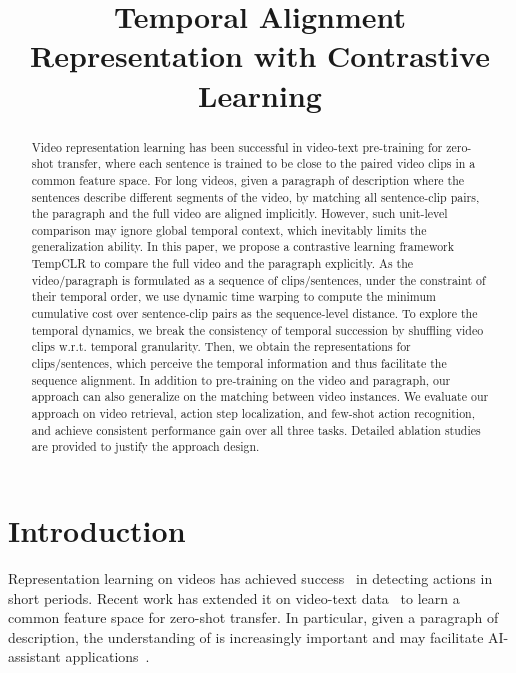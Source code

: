 \title{Temporal Alignment Representation with Contrastive Learning}



\maketitle
\let\thefootnote\relax{}

\begin{abstract}

Video representation learning has been successful in video-text pre-training for zero-shot transfer, where each sentence is trained to be close to the paired video clips in a common feature space. For long videos, given a paragraph of description where the sentences describe different segments of the video, by matching all sentence-clip pairs,  the paragraph and the full video are aligned implicitly. However, such unit-level comparison may ignore global temporal context, which inevitably limits the generalization ability. In this paper, we propose a contrastive learning framework TempCLR to compare the full video and the paragraph explicitly. As the video/paragraph is formulated as a sequence of clips/sentences, under the constraint of their temporal order, we use dynamic time warping to compute the minimum cumulative cost over sentence-clip pairs as the sequence-level distance. To explore the temporal dynamics, we break the consistency of temporal succession by shuffling video clips w.r.t. temporal granularity. Then, we obtain the representations for clips/sentences, which perceive the temporal information and thus facilitate the sequence alignment. In addition to pre-training on the video and paragraph, our approach can also generalize on the matching between video instances. We evaluate our approach on video retrieval, action step localization, and few-shot action recognition, and achieve consistent performance gain over all three tasks. Detailed ablation studies are provided to justify the approach design.

\end{abstract}

\section{Introduction}

Representation learning on videos has achieved success~\citep{goroshin2015unsupervised,feichtenhofer2021large} in detecting actions in short periods. Recent work has extended it on video-text data~\citep{miech2019howto100m,radford2021learning} to learn a common feature space for zero-shot transfer. In particular, given a paragraph of description, the understanding of  is increasingly important and may facilitate AI-assistant applications~\citep{grauman2022ego4d,lin2022learning,chen2022weakly}.

